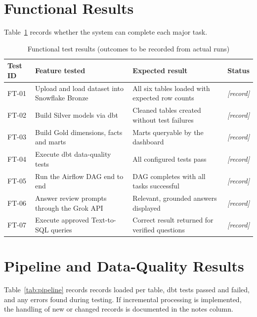 \documentclass[12pt,a4paper]{report}
\newcommand{\ph}[1]{\textit{[#1]}}
\begin{document}
\section{Functional Results}
Table~\ref{tab:functional} records whether the system can complete each major task.

\begin{table}[htbp]
\centering
\caption{Functional test results (outcomes to be recorded from actual runs)}
\label{tab:functional}
\small
\begin{tabular}{@{}p{1.3cm}p{4.3cm}p{4.4cm}p{2.8cm}@{}}
\toprule
\textbf{Test ID} & \textbf{Feature tested} & \textbf{Expected result} & \textbf{Status} \\
\midrule
FT-01 & Upload and load dataset into Snowflake Bronze & All six tables loaded with expected row counts & \ph{record} \\
FT-02 & Build Silver models via dbt & Cleaned tables created without test failures & \ph{record} \\
FT-03 & Build Gold dimensions, facts and marts & Marts queryable by the dashboard & \ph{record} \\
FT-04 & Execute dbt data-quality tests & All configured tests pass & \ph{record} \\
FT-05 & Run the Airflow DAG end to end & DAG completes with all tasks successful & \ph{record} \\
FT-06 & Answer review prompts through the Grok API & Relevant, grounded answers displayed & \ph{record} \\
FT-07 & Execute approved Text-to-SQL queries & Correct result returned for verified questions & \ph{record} \\
\bottomrule
\end{tabular}
\end{table}

\section{Pipeline and Data-Quality Results}
Table~\ref{tab:pipeline} records records loaded per table, dbt tests passed and failed, and any errors found during testing. If incremental processing is implemented, the handling of new or changed records is documented in the notes column.
\end{document}
